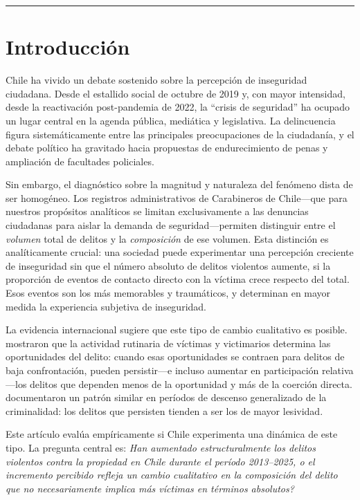 \documentclass[12pt,a4paper]{article}
\begin{document}
\vspace{4pt}
\noindent\rule{\linewidth}{0.5pt}

\bigskip

\section{Introducci\'on}

Chile ha vivido un debate sostenido sobre la percepci\'on de inseguridad ciudadana.
Desde el estallido social de octubre de 2019 y, con mayor intensidad, desde la
reactivaci\'on post-pandemia de 2022, la ``crisis de seguridad'' ha ocupado un lugar
central en la agenda p\'ublica, medi\'atica y legislativa. La delincuencia figura
sistem\'aticamente entre las principales preocupaciones de la ciudadan\'ia, y el debate
pol\'itico ha gravitado hacia propuestas de endurecimiento de penas y ampliaci\'on de
facultades policiales.

Sin embargo, el diagn\'ostico sobre la magnitud y naturaleza del fen\'omeno dista de
ser homog\'eneo. Los registros administrativos de Carabineros de
Chile---que para nuestros prop\'ositos anal\'iticos se limitan exclusivamente a las denuncias ciudadanas para aislar la demanda de seguridad---permiten distinguir
entre el \emph{volumen} total de delitos y la \emph{composici\'on} de ese volumen. Esta
distinci\'on es anal\'iticamente crucial: una sociedad puede experimentar una percepci\'on
creciente de inseguridad sin que el n\'umero absoluto de delitos violentos aumente, si
la proporci\'on de eventos de contacto directo con la v\'ictima crece respecto del total.
Esos eventos son los m\'as memorables y traum\'aticos, y determinan en mayor medida la
experiencia subjetiva de inseguridad.

La evidencia internacional sugiere que este tipo de cambio cualitativo es posible.
\citet{cohen1979} mostraron que la actividad rutinaria de v\'ictimas y victimarios
determina las oportunidades del delito: cuando esas oportunidades se contraen para
delitos de baja confrontaci\'on, pueden persistir---e incluso aumentar en participaci\'on
relativa---los delitos que dependen menos de la oportunidad y m\'as de la coerci\'on
directa. \citet{blumstein1988} documentaron un patr\'on similar en per\'iodos de
descenso generalizado de la criminalidad: los delitos que persisten tienden a ser los
de mayor lesividad.

Este art\'iculo eval\'ua emp\'iricamente si Chile experimenta una din\'amica de este
tipo. La pregunta central es: \textit{\textquestiondown Han aumentado estructuralmente
los delitos violentos contra la propiedad en Chile durante el per\'iodo 2013--2025,
o el incremento percibido refleja un cambio cualitativo en la composici\'on del delito
que no necesariamente implica m\'as v\'ictimas en t\'erminos absolutos?}
\end{document}

